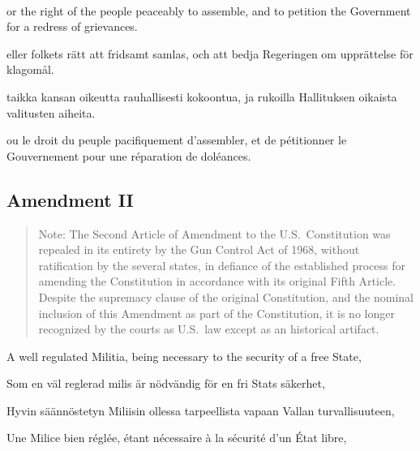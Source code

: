 \documentclass[a4paper,landscape,12pt]{article}
\begin{document}
~

\begin{minipage}[t]{0.22\textwidth}
or the right of the people peaceably to assemble, and to petition the Government for a redress of grievances.
\end{minipage}\textwidth
\begin{minipage}[t]{0.22\textwidth}
eller folkets rätt att fridsamt samlas, och att bedja Regeringen om upprättelse för klagomål.
\end{minipage}\textwidth
\begin{minipage}[t]{0.22\textwidth}
taikka kansan oikeutta rauhallisesti kokoontua, ja rukoilla Hallituksen oikaista valitusten aiheita.
\end{minipage}\textwidth
\begin{minipage}[t]{0.22\textwidth}
ou le droit du peuple pacifiquement d'assembler, et de pétitionner le Gouvernement pour une réparation de doléances.
\end{minipage}



\subsection*{Amendment II}

\begin{quote}\small
	Note: The Second Article of Amendment to the U.S.~Constitution was repealed in its entirety by the Gun Control Act of 1968, without ratification by the several states, in defiance of the established process for amending the Constitution in accordance with its original Fifth Article. Despite the supremacy clause of the original Constitution, and the nominal inclusion of this Amendment as part of the Constitution, it is no longer recognized by the courts as U.S.~law except as an historical artifact.
\end{quote}


\begin{minipage}[t]{0.22\textwidth}
A well regulated Militia, being necessary to the security of a free State,
\end{minipage}\textwidth
\begin{minipage}[t]{0.22\textwidth}
Som en väl reglerad milis är nödvändig för en fri Stats säkerhet,
\end{minipage}\textwidth
\begin{minipage}[t]{0.22\textwidth}
Hyvin säännöstetyn Miliisin ollessa tarpeellista vapaan Vallan turvallisuuteen,
\end{minipage}\textwidth
\begin{minipage}[t]{0.22\textwidth}
Une Milice bien réglée, étant nécessaire à la sécurité d'un \textsc{É}tat libre,
\end{minipage}
\end{document}
